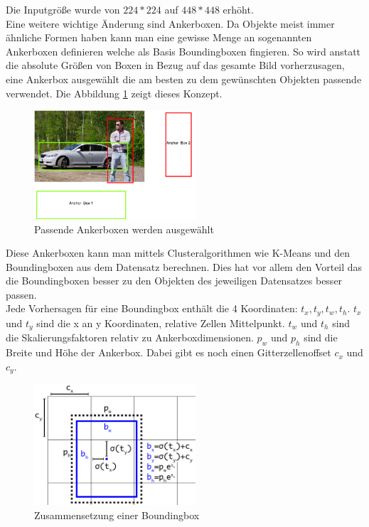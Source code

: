 \documentclass[conference]{IEEEtran}
\begin{document}
	Die Inputgröße wurde von $224*224$ auf $448*448$ erhöht.\\
	Eine weitere wichtige Änderung sind Ankerboxen. Da Objekte meist immer ähnliche Formen haben kann man eine gewisse Menge an sogenannten Ankerboxen definieren welche als Basis Boundingboxen fingieren. So wird anstatt die absolute Größen von Boxen in Bezug auf das gesamte Bild vorherzusagen, eine Ankerbox ausgewählt die am besten zu dem gewünschten Objekten passende verwendet. Die Abbildung \ref{Anker} zeigt dieses Konzept.
	\begin{figure}[!h]
		\begin{center}
			\includegraphics[width=6cm]{Media/Ankerboxen.png}
			\caption{Passende Ankerboxen werden ausgewählt\cite{b0}}
			\label{Anker}
		\end{center}
	\end{figure}
	Diese Ankerboxen kann man mittels Clusteralgorithmen wie K-Means und den Boundingboxen aus dem Datensatz berechnen. Dies hat vor allem den Vorteil das die Boundingboxen besser zu den Objekten des jeweiligen Datensatzes besser passen. \cite{b3}\\
	Jede Vorhersagen für eine Boundingbox enthält die 4 Koordinaten: $t_x, t_y, t_w, t_h$. $t_x$ und $ t_y$ sind die x an y Koordinaten, relative Zellen Mittelpunkt. $t_w$ und $ t_h$ sind die Skalierungsfaktoren relativ zu Ankerboxdimensionen. $p_w$ und $p_h$ sind die Breite und Höhe der Ankerbox. Dabei gibt es noch einen Gitterzellenoffset $c_x$ und $c_y$.
	\begin{figure}[!h]
		\begin{center}
			\includegraphics[width=6cm]{Media/YoloV3PredictionBox.png}
			\caption{Zusammensetzung einer Boundingbox\cite{b3}}
			\label{PredictionBox}
		\end{center}
	\end{figure}\\
\end{document}
